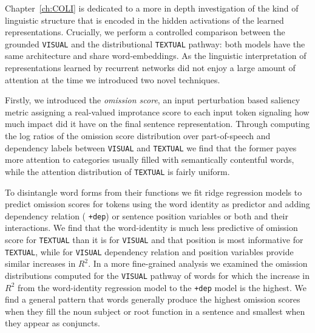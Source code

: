 Chapter~\ref{ch:COLI} is dedicated to a more in depth investigation
of the kind of linguistic structure that is encoded in the hidden activations of the learned representations. 
Crucially, we perform a controlled comparison between the grounded \texttt{VISUAL} and the distributional 
 \texttt{TEXTUAL} pathway: both models have the same architecture and share word-embeddings.
 As the linguistic interpretation of representations learned by recurrent networks did not enjoy a 
 large amount of  attention at the time we introduced two novel techniques. 
 
 Firstly, we introduced the \emph{omission score}, an input perturbation based saliency metric assigning a 
 real-valued improtance score to each input token signaling how much impact did it have on 
 the final sentence representation. Through computing the 
 log ratios of the omission score distribution over part-of-speech and dependency labels  between
 \texttt{VISUAL} and \texttt{TEXTUAL} we find that 	the former payes more attention to categories
 usually filled with semantically contentful words, while the attention distribution of \texttt{TEXTUAL}
 is fairly uniform.
 
 To disintangle word forms from their functions we fit ridge regression models 
 to predict omission scores for tokens using the word
 identity as predictor and adding dependency relation ( \texttt{+dep}) or
 sentence position variables or both and their interactions. 
 We find that the word-identity is much less predictive of omission score for \texttt{TEXTUAL}
 than it is for  \texttt{VISUAL} and that position is most informative for \texttt{TEXTUAL},
 while for \texttt{VISUAL} dependency relation and position variables provide similar increases
 in $R^2$. In a more fine-grained analysis we examined the omission distributions
 computed for the \texttt{VISUAL} pathway of words for which the increase in 
 $R^2$ from the word-identity regression model to the \texttt{+dep} model is the highest.
 We find a general pattern that words generally produce the highest omission scores
 when they fill the noun subject or root function in a sentence and smallest when they appear 
 as conjuncts.

